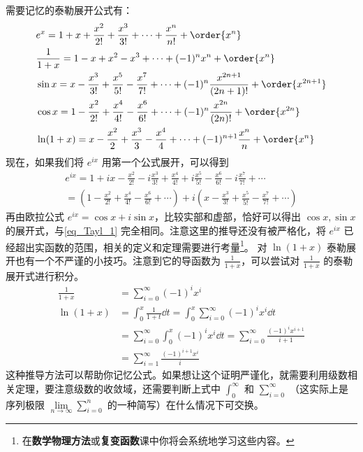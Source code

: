 需要记忆的泰勒展开公式有：
\begin{equation}\label{eq_Tayl_1}
\begin{aligned}
&e^x=1+x+\frac{x^2}{2!}+\frac{x^3}{3!}+\cdots+\frac{x^n}{n!}+\order{x^n}\\
&\frac{1}{1+x}=1-x+x^2-x^3+\cdots+(-1)^nx^n+\order{x^n}\\
&\sin x=x-\frac{x^3}{3!}+\frac{x^5}{5!}-\frac{x^7}{7!}+\cdots+(-1)^n\frac{x^{2n+1}}{(2n+1)!}+\order{x^{2n+1}}\\
&\cos x=1-\frac{x^2}{2!}+\frac{x^4}{4!}-\frac{x^6}{6!}+\cdots+(-1)^n\frac{x^{2n}}{(2n)!}+\order{x^{2n}}\\
&\ln (1+x)=x-\frac{x^2}{2}+\frac{x^3}{3}-\frac{x^4}{4}+\cdots+(-1)^{n+1}\frac{x^n}{n}+\order{x^n}\\
\end{aligned}
\end{equation}
现在，如果我们将 $e^{ix}$ 用第一个公式展开，可以得到
\begin{equation}
\begin{aligned}
e^{ix}=1+ix-\frac{x^2}{2!}-i\frac{x^3}{3!}+\frac{x^4}{4!}+i\frac{x^5}{5!}-\frac{x^6}{6!}-i\frac{x^7}{7!}+\cdots\\
=(1-\frac{x^2}{2!}+\frac{x^4}{4!}-\frac{x^6}{6!}+\cdots)+i(x-\frac{x^3}{3!}+\frac{x^5}{5!}-\frac{x^7}{7!}+\cdots)
\end{aligned}
\end{equation}
再由欧拉公式 $e^{ix}=\cos x+i\sin x$，比较实部和虚部，恰好可以得出 $\cos x,\sin x$ 的展开式，与\autoref{eq_Tayl_1} 完全相同。注意这里的推导还没有被严格化，将 $e^{ix}$ 已经超出实函数的范围，相关的定义和定理需要进行考量\footnote{在\textbf{数学物理方法}或\textbf{复变函数}课中你将会系统地学习这些内容。}。
对 $\ln(1+x)$ 泰勒展开也有一个不严谨的小技巧。注意到它的导函数为 $\frac{1}{1+x}$，可以尝试对 $\frac{1}{1+x}$ 的泰勒展开式进行积分。
\begin{equation}
\begin{aligned}
\frac{1}{1+x}&=\sum_{i=0}^{\infty} (-1)^i x^i\\
\ln(1+x)&=\int_0^x \frac{1}{1+t}\dd t = \int_0^x \sum_{i=0}^{\infty} (-1)^i x^i\dd t \\
&= \sum_{i=0}^{\infty} \int_0^x(-1)^i x^i\dd t = \sum_{i=0}^{\infty} \frac{(-1)^i x^{i+1}}{i+1}\\
&= \sum_{i=1}^{\infty} \frac{(-1)^{i+1} x^{i}}{i}
\end{aligned}
\end{equation}
这种推导方法可以帮助你记忆公式。如果想让这个证明严谨化，就需要利用级数相关定理，要注意级数的收敛域，还需要判断上式中 $\int_0^{\infty}$ 和 $\sum_{i=0}^{\infty}$ （这实际上是序列极限 $\lim\limits_{n\rightarrow \infty} \sum_{i=0}^{n}$ 的一种简写）在什么情况下可交换。
